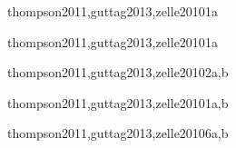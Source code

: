 \begin{syllabus}
\begin{unit}{\PLOverviewDef}{thompson2011,guttag2013,zelle2010}{1}{a}
   \begin{learningoutcomes}
      \item \PLOverviewObjONE
      \item \PLOverviewObjTWO
   \end{learningoutcomes}
\end{unit}

\begin{unit}{\PLDeclarationsAndTypesDef}{thompson2011,guttag2013,zelle2010}{1}{a}
    \begin{topics}%
	\item \PLDeclarationsAndTypesTopicThe%
	\item \PLDeclarationsAndTypesTopicOverview%
    \end{topics}%
    \PLDeclarationsAndTypesAllObjectives
\end{unit}

\begin{unit}{\PFFundamentalConstructsDef}{thompson2011,guttag2013,zelle2010}{2}{a,b}
  \PFFundamentalConstructsAllTopics
  \PFFundamentalConstructsAllObjectives
\end{unit}

\begin{unit}{\PLFunctionalProgrammingDef}{thompson2011,guttag2013,zelle2010}{1}{a,b}
    \begin{topics}%
	\item \PLFunctionalProgrammingTopicOverview%
	\item \PLFunctionalProgrammingTopicRecursion%
	\item \PLFunctionalProgrammingTopicPragmatics%
    \end{topics}%
   \PLFunctionalProgrammingAllObjectives
\end{unit}

\begin{unit}{\PFRecursionDef}{thompson2011,guttag2013,zelle2010}{6}{a,b}
    \begin{topics}%
	\item \PFRecursionTopicTheconcept%
	\item \PFRecursionTopicRecursive%
	\item \PFRecursionTopicSimple%
	\item \PFRecursionTopicDiveAndConquer%
    \end{topics}%

    \begin{learningoutcomes}%
	\item \PFRecursionObjONE%
	\item \PFRecursionObjTWO%
	\item \PFRecursionObjTHREE%
	\item \PFRecursionObjFOUR%
	\item \PFRecursionObjFIVE%
	\item \PFRecursionObjSIX%
	\item \PFRecursionObjEIGHT%
    \end{learningoutcomes}%
\end{unit}


\end{syllabus}
